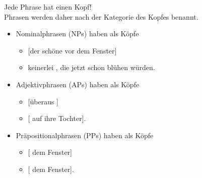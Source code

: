 \begin{frame}
  {Jede Phrase hat einen Kopf!}
  \onslide<+->
  \onslide<+->
  \\
  \onslide<+->
  \Halbzeile
  Phrasen werden daher nach der Kategorie des Kopfes benannt.\\
  \Zeile
  \begin{itemize}[<+->]
    \item \alert{Nominalphrasen} (NPs) haben  als Köpfe
      \begin{itemize}[<+->]
        \item \alert{[der schöne  vor dem Fenster]}
        \item {} \alert{keinerlei , die jetzt schon blühen würden}.
      \end{itemize}
      \Halbzeile
    \item \alert{Adjektivphrasen} (APs) haben  als Köpfe
      \begin{itemize}[<+->]
        \item {} \alert{[überaus ]} 
        \item {} \alert{[ auf ihre Tochter]}.
      \end{itemize}
      \Halbzeile
    \item \alert{Präpositionalphrasen} (PPs) haben  als Köpfe
      \begin{itemize}[<+->]
        \item {} \alert{[ dem Fenster]}
        \item {} \alert{[ dem Fenster]}.
      \end{itemize}
  \end{itemize}
\end{frame}



